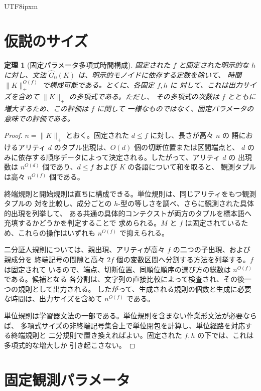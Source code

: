 \documentclass[10pt,a4paper]{article}
\newtheorem{theorem}{定理}[section]
\theoremstyle{remark}
\begin{document}
\begin{CJK}{UTF8}{ipxm}
\section{仮説のサイズ}
\label{sec:poly-time}

\begin{theorem}[固定パラメータ多項式時間構成]
\label{thm:poly}
固定された \(f\) と固定された明示的な \(h\) に対し、文法
\(\widehat G_0(K)\) は、明示的モノイドに依存する定数を除いて、
時間 \(\|K\|_+^{O(f)}\) で構成可能である。とくに、各固定 \(f,h\) に
対して、これは出力サイズを含めて \(\|K\|_+\) の多項式である。ただし、
その多項式の次数は \(f\) とともに増大するため、この評価は \(f\) に関して
一様なものではなく、固定パラメータの意味での評価である。
\end{theorem}

\begin{proof}
\(n=\|K\|_+\) とおく。固定された \(d\le f\) に対し、長さが高々 \(n\) の
語におけるアリティ \(d\) のタプル出現は、\(O(d)\) 個の切断位置または区間端点と、
\(d\) のみに依存する順序データによって決定される。したがって、アリティ \(d\) の
出現数は \(n^{O(d)}\) 個であり、\(d\le f\) および \(K\) の各語について和を取ると、
観測タプルは高々 \(n^{O(f)}\) 個である。

終端規則と開始規則は直ちに構成できる。単位規則は、同じアリティをもつ観測タプルの
対を比較し、成分ごとの \(h\)-型の等しさを調べ、さらに観測された具体的出現を列挙して、
ある共通の具体的コンテクストが両方のタプルを標本語へ充填するかどうかを判定することで
求められる。\(M\) と \(f\) は固定されているため、これらの操作はいずれも
\(n^{O(f)}\) で抑えられる。

二分証人規則については、親出現、アリティが高々 \(f\) の二つの子出現、および親成分を
終端記号の間隙と高々 \(2f\) 個の変数区間へ分割する方法を列挙する。\(f\) は固定されて
いるので、端点、切断位置、同順位順序の選び方の総数は \(n^{O(f)}\) である。候補となる
各分割は、文字列の直接比較によって検査され、その後一つの規則として出力される。
したがって、生成される規則の個数と生成に必要な時間は、出力サイズを含めて
\(n^{O(f)}\) である。

単位規則は学習器文法の一部である。単位規則を含まない作業形文法が必要ならば、
多項式サイズの非終端記号集合上で単位閉包を計算し、単位経路を対応する終端規則と
二分規則で置き換えればよい。固定された \(f,h\) の下では、これは多項式的な増大しか
引き起こさない。
\end{proof}


\section{固定観測パラメータ}
\label{sec:fixed-observation}


\end{CJK}
\end{document}
